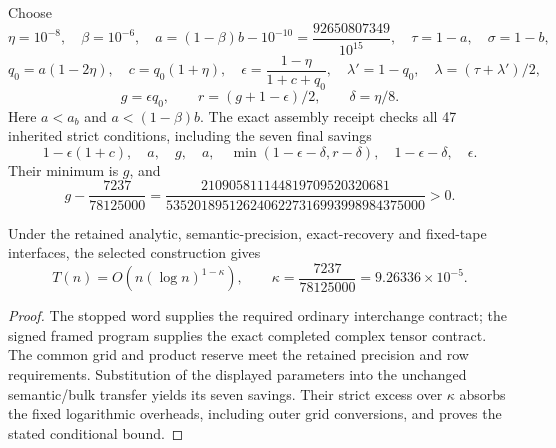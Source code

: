 Choose
\[
 \eta=10^{-8},\quad\beta=10^{-6},\quad
 a=(1-\beta)b-10^{-10}=\frac{92650807349}{10^{15}},
 \quad\tau=1-a,\quad\sigma=1-b,
\]
\[
 q_0=a(1-2\eta),\quad c=q_0(1+\eta),\quad
 \epsilon=\frac{1-\eta}{1+c+q_0},\quad
 \lambda'=1-q_0,\quad\lambda=(\tau+\lambda')/2,
\]
\[
 g=\epsilon q_0,\qquad r=(g+1-\epsilon)/2,\qquad\delta=\eta/8.
\]
Here $a<a_b$ and $a<(1-\beta)b$. The exact assembly receipt checks all
47 inherited strict conditions, including the seven final savings
\[
 1-\epsilon(1+c),\quad a,\quad g,\quad a,\quad
 \min(1-\epsilon-\delta,r-\delta),\quad
 1-\epsilon-\delta,\quad\epsilon.
\]
Their minimum is $g$, and
\[
 g-\frac{7237}{78125000}
 =\frac{210905811144819709520320681}
 {5352018951262406227316993998984375000}>0.
\]
\begin{theorem}
Under the retained analytic, semantic-precision, exact-recovery and
fixed-tape interfaces, the selected construction gives
\[
 T(n)=O\!\left(n(\log n)^{1-\kappa}\right),\qquad
 \boxed{\kappa=\frac{7237}{78125000}=9.26336\times10^{-5}}.
\]
\end{theorem}
\begin{proof}
The stopped word supplies the required ordinary interchange contract;
the signed framed program supplies the exact completed complex tensor
contract. The common grid and product reserve meet the retained precision
and row requirements. Substitution of the displayed parameters into the
unchanged semantic/bulk transfer yields its seven savings. Their strict
excess over $\kappa$ absorbs the fixed logarithmic overheads, including
outer grid conversions, and proves the stated conditional bound.
\end{proof}
